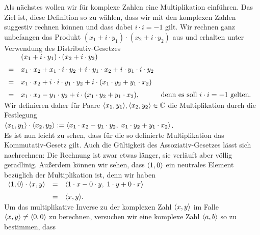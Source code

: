 Als nächstes wollen wir für 
komplexe Zahlen eine Multiplikation einführen.   Das Ziel ist,
diese Definition so zu wählen, dass wir mit den komplexen Zahlen suggestiv rechnen können
und dass dabei $i \cdot i = -1$ gilt.  Wir rechnen ganz unbefangen das Produkt 
$(x_1 + i \cdot y_1) \cdot (x_2 + i \cdot y_2)$ aus und erhalten unter Verwendung des
Distributiv-Gesetzes 
\\[0.2cm]
\hspace*{1.3cm}
$
\begin{array}[t]{cll}
  & (x_1 + i \cdot y_1) \cdot (x_2 + i \cdot y_2) \\[0.2cm]
= & x_1 \cdot x_2 + x_1 \cdot i \cdot y_2 + i \cdot y_1 \cdot x_2 + i \cdot y_1 \cdot i \cdot y_2
    \\[0.2cm]
= & x_1 \cdot x_2 + i \cdot i \cdot y_1 \cdot y_2 + i \cdot (x_1 \cdot y_2 + y_1 \cdot x_2) \\[0.2cm]
= & x_1 \cdot x_2 - y_1 \cdot y_2 + i \cdot (x_1 \cdot y_2 + y_1 \cdot x_2),
  & \mbox{denn es soll $i \cdot i = -1$ gelten.} 
\end{array}
$
\\[0.2cm]
Wir definieren daher für Paare $\pair(x_1,y_1), \pair(x_2,y_2) \in \mathbb{C}$ die Multiplikation durch
die Festlegung
\\[0.2cm]
\hspace*{1.3cm}
$\pair(x_1,y_1) \cdot \pair(x_2,y_2) := 
 \pair(x_1 \cdot x_2 - y_1 \cdot y_2,\; x_1 \cdot y_2 + y_1 \cdot x_2)
$.
\\[0.2cm]
Es ist nun leicht zu sehen, dass für die so definierte Multiplikation das Kommutativ-Gesetz gilt.
Auch die Gültigkeit des Assoziativ-Gesetzes lässt sich nachrechnen: Die Rechnung ist zwar etwas länger,
sie verläuft aber völlig geradlinig.  Außerdem können wir sehen, dass $\pair(1,0)$ ein neutrales Element
bezüglich der Multiplikation ist, denn wir haben
\\[0.2cm]
\hspace*{1.3cm}
$
\begin{array}[t]{lcll}
  \pair(1,0) \cdot \pair(x,y) & = & \pair(1 \cdot x - 0 \cdot y,\; 1 \cdot y + 0 \cdot x) \\[0.2cm]
                              & = & \pair(x, y). 
\end{array}
$
\\[0.2cm]
Um das multiplikative Inverse zu der komplexen Zahl $\pair(x,y)$ im Falle $\pair(x,y) \not= \pair(0,0)$
zu berechnen, versuchen wir eine komplexe Zahl $\pair(a,b)$ so zu bestimmen, dass
\\[0.2cm]
